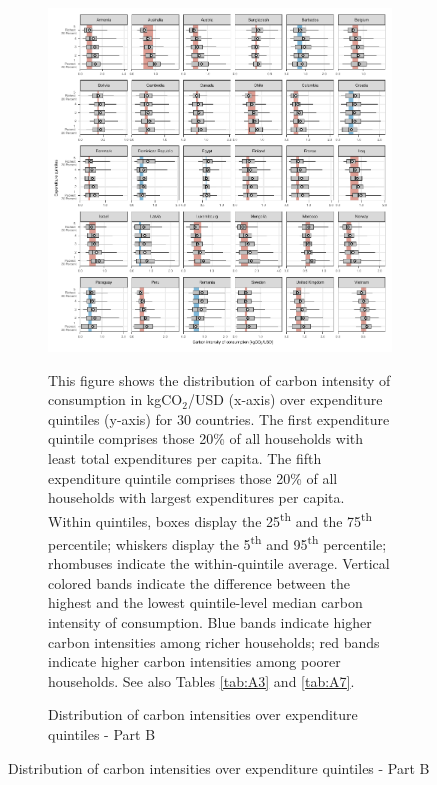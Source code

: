 \clearpage

\begin{figure}[ht!]\ContinuedFloat
   \begin{subfigure}[b]{\textwidth}
  \centering
  \includegraphics{1_Figures/Figures_Appendix/Figure_1_2017_Appendix_2.pdf}
  \caption{Distribution of carbon intensities over expenditure quintiles - Part B} \label{fig:Quint_B}
  \begin{subcaption2}
    This figure shows the distribution of carbon intensity of consumption in kgCO$_{2}$/USD (x-axis) over expenditure quintiles (y-axis) for 30 countries. The first expenditure quintile comprises those 20\% of all households with least total expenditures per capita. The fifth expenditure quintile comprises those 20\% of all households with largest expenditures per capita. Within quintiles, boxes display the 25\textsuperscript{th} and the 75\textsuperscript{th} percentile; whiskers display the 5\textsuperscript{th} and 95\textsuperscript{th} percentile; rhombuses indicate the within-quintile average. Vertical colored bands indicate the difference between the highest and the lowest quintile-level median carbon intensity of consumption. Blue bands indicate higher carbon intensities among richer households; red bands indicate higher carbon intensities among poorer households. See also Tables \ref{tab:A3} and \ref{tab:A7}.
  \end{subcaption2}
\end{subfigure}
\end{figure}


